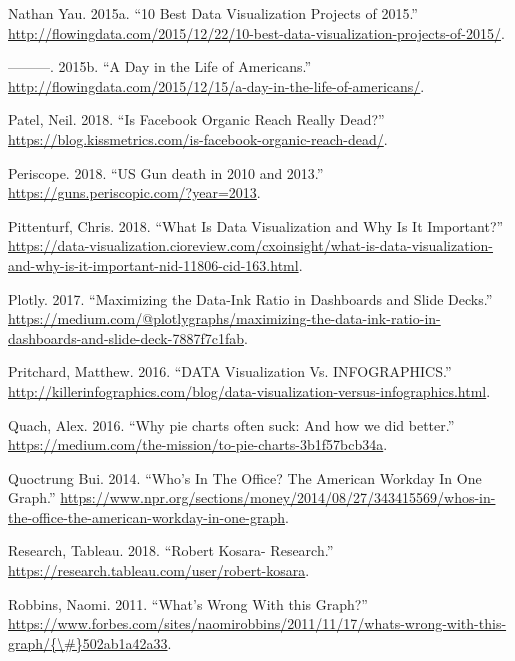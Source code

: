 \documentclass[]{book}
\begin{document}
\leavevmode\hypertarget{ref-10_best}{}%
Nathan Yau. 2015a. ``10 Best Data Visualization Projects of 2015.'' \url{http://flowingdata.com/2015/12/22/10-best-data-visualization-projects-of-2015/}.

\leavevmode\hypertarget{ref-American_life}{}%
---------. 2015b. ``A Day in the Life of Americans.'' \url{http://flowingdata.com/2015/12/15/a-day-in-the-life-of-americans/}.

\leavevmode\hypertarget{ref-facebook_organic}{}%
Patel, Neil. 2018. ``Is Facebook Organic Reach Really Dead?'' \url{https://blog.kissmetrics.com/is-facebook-organic-reach-dead/}.

\leavevmode\hypertarget{ref-narratives_2017}{}%
Periscope. 2018. ``US Gun death in 2010 and 2013.'' \url{https://guns.periscopic.com/?year=2013}.

\leavevmode\hypertarget{ref-viz_importance}{}%
Pittenturf, Chris. 2018. ``What Is Data Visualization and Why Is It Important?'' \url{https://data-visualization.cioreview.com/cxoinsight/what-is-data-visualization-and-why-is-it-important-nid-11806-cid-163.html}.

\leavevmode\hypertarget{ref-appli_2017}{}%
Plotly. 2017. ``Maximizing the Data-Ink Ratio in Dashboards and Slide Decks.'' \url{https://medium.com/@plotlygraphs/maximizing-the-data-ink-ratio-in-dashboards-and-slide-deck-7887f7c1fab}.

\leavevmode\hypertarget{ref-VIZVSINFO}{}%
Pritchard, Matthew. 2016. ``DATA Visualization Vs. INFOGRAPHICS.'' \url{http://killerinfographics.com/blog/data-visualization-versus-infographics.html}.

\leavevmode\hypertarget{ref-quach-penny}{}%
Quach, Alex. 2016. ``Why pie charts often suck: And how we did better.'' \url{https://medium.com/the-mission/to-pie-charts-3b1f57bcb34a}.

\leavevmode\hypertarget{ref-NPR_workday}{}%
Quoctrung Bui. 2014. ``Who's In The Office? The American Workday In One Graph.'' \url{https://www.npr.org/sections/money/2014/08/27/343415569/whos-in-the-office-the-american-workday-in-one-graph}.

\leavevmode\hypertarget{ref-research_viz}{}%
Research, Tableau. 2018. ``Robert Kosara- Research.'' \url{https://research.tableau.com/user/robert-kosara}.

\leavevmode\hypertarget{ref-whats_wrong}{}%
Robbins, Naomi. 2011. ``What's Wrong With this Graph?'' \href{https://www.forbes.com/sites/naomirobbins/2011/11/17/whats-wrong-with-this-graph/\%7B/\#\%7D502ab1a42a33}{https://www.forbes.com/sites/naomirobbins/2011/11/17/whats-wrong-with-this-graph/\{\textbackslash{}\#\}502ab1a42a33}.
\end{document}
